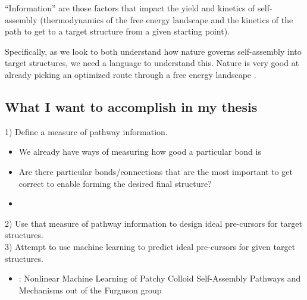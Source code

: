 \documentclass[12pt, oneside]{article}   	%
\begin{document}
``Information'' are those factors that impact the yield and kinetics of self-assembly (thermodynamics of the free energy landscape and the kinetics of the path to get to a target structure from a given starting point).

Specifically, as we look to both understand how nature governs self-assembly into target structures, we need a language to understand this.
Nature is very good at already picking an optimized route through a free energy landscape \cite{Jacobs_2016_BiophysicalJournal}.

\subsection{What I want to accomplish in my thesis}


1) Define a measure of pathway information. \\
\begin{itemize}
\item We already have ways of measuring how good a particular bond is
\item Are there particular bonds/connections that are the most important to get correct to enable forming the desired final structure?
\item  
\end{itemize}



2) Use that measure of pathway information to design ideal pre-cursors for target structures. \\



3) Attempt to use machine learning to predict ideal pre-cursors for given target structures. \\
\begin{itemize}
\item \cite{Long_2014_JPhysChemB}: Nonlinear Machine Learning of Patchy Colloid Self-Assembly Pathways and Mechanisms out of the Furguson group
\end{itemize}
\end{document}
